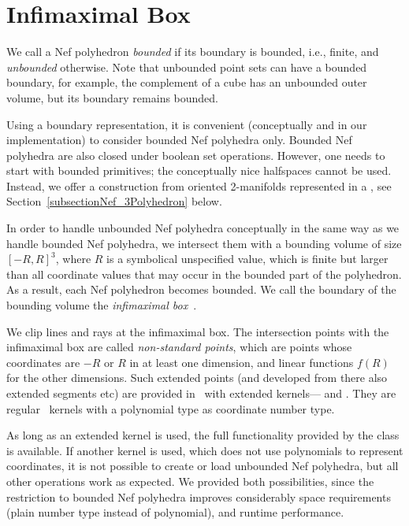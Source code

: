 \section{Infimaximal Box}
\label{sectionNef_3InfiBox}

We call a Nef polyhedron \emph{bounded} if its boundary is bounded,
i.e., finite, and \emph{unbounded} otherwise. Note that unbounded
point sets can have a bounded boundary, for example, the complement of
a cube has an unbounded outer volume, but its boundary remains bounded.

Using a boundary representation, it is convenient (conceptually and in
our implementation) to consider bounded Nef polyhedra only.  Bounded
Nef polyhedra are also closed under boolean set operations. However, one
needs to start with bounded primitives; the conceptually nice
halfspaces cannot be used. Instead, we offer a construction from oriented
2-manifolds represented in a  , see
Section~\ref{subsectionNef_3Polyhedron} below.

In order to handle unbounded Nef polyhedra conceptually in the same
way as we handle bounded Nef polyhedra, we intersect them with a
bounding volume of size $[-R,R]^3$, where $R$ is a symbolical
unspecified value, which is finite but larger than all coordinate
values that may occur in the bounded part of the polyhedron. As a
result, each Nef polyhedron becomes bounded.  We call the boundary of
the bounding volume the \emph{infimaximal
  box}~\cite{cgal:sm-iftml-00}.

We clip lines and rays at the infimaximal box. The intersection points
with the infimaximal box are called \emph{non-standard points}, which
are points whose coordinates are $-R$ or $R$ in at least one
dimension, and linear functions $f(R)$ for the other dimensions. Such
extended points (and developed from there also extended segments etc)
are provided in \cgal\ with extended
kernels--- and
.  They are regular \cgal\ kernels
with a polynomial type as coordinate number type.

As long as an extended kernel is used, the full functionality provided
by the  class is available. If another
kernel is used, which does not use polynomials to represent
coordinates, it is not possible to create or load unbounded Nef
polyhedra, but all other operations work as expected. We provided both
possibilities, since the restriction to bounded Nef polyhedra improves
considerably space requirements (plain number type instead of
polynomial), and runtime performance.


